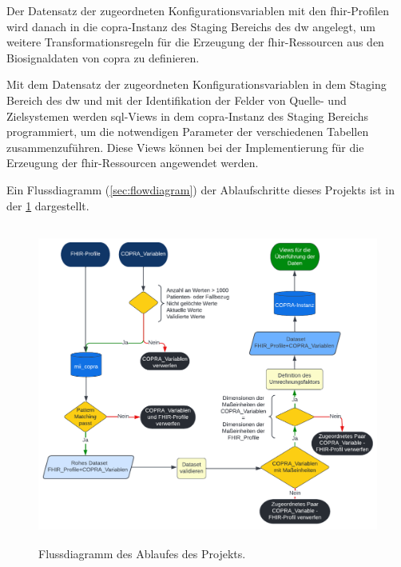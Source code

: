 Der Datensatz der zugeordneten Konfigurationsvariablen mit den \ac{fhir}-Profilen wird danach in die \ac{copra}-Instanz des Staging Bereichs des \ac{dw} angelegt, um weitere Transformationsregeln für die Erzeugung der \ac{fhir}-Ressourcen aus den Biosignaldaten von \ac{copra} zu definieren.

Mit dem Datensatz der zugeordneten Konfigurationsvariablen in dem Staging Bereich des \ac{dw} und mit der Identifikation der Felder von Quelle- und Zielsystemen werden \ac{sql}-Views in dem \ac{copra}-Instanz des Staging Bereichs programmiert, um die notwendigen Parameter der verschiedenen Tabellen zusammenzuführen. Diese Views können bei der Implementierung für die Erzeugung der \ac{fhir}-Ressourcen angewendet werden.

Ein Flussdiagramm (\ref{sec:flowdiagram}) der Ablaufschritte dieses Projekts ist in der \ref{fig:flowdiagram} dargestellt.

\clearpage

\begin{figure}[ht]
	\centering
	\includegraphics[height=10.5cm]{figures/thesis_flow}
	\caption[Flussdiagramm des Ablaufes des Projekts]{Flussdiagramm des Ablaufes des Projekts.}
	\label{fig:flowdiagram}
\end{figure}